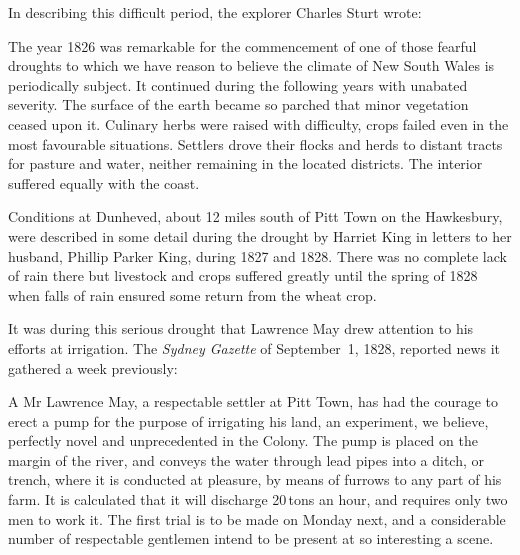 In describing this difficult period, the explorer Charles Sturt
 wrote:
\begin{Quote}
	The year 1826 was remarkable for the commencement of one of
	those fearful droughts to which we have reason
	to believe the climate of New South Wales is periodically
	subject.  It continued during the following years with
	unabated severity.  The surface of the earth became so parched
	that minor vegetation ceased upon it.  Culinary herbs were
	raised with difficulty, crops failed even in the most
	favourable situations.  Settlers drove their flocks and herds
	to distant tracts for pasture and water,
	neither remaining in the located districts.  The interior
	suffered equally with the coast.
\end{Quote}

Conditions at Dunheved, about 12 miles south of
Pitt Town on the Hawkesbury, were described in
some detail during the drought by Harriet King
 in letters to her husband, Phillip Parker King,
  during 1827 and 1828. There was no complete lack
of rain there but livestock and crops suffered greatly until the
spring of 1828 when falls of rain ensured some return from the
wheat crop.

It was during this serious drought that Lawrence May
drew attention to his efforts at irrigation.  The \textit{Sydney
Gaz\-ette} of September~1, 1828, reported news it gathered a week
previously:
\begin{Quote}
	A Mr Lawrence May, a respectable settler at Pitt Town, has had
	the courage to erect a pump for the
	purpose of irrigating his land, an experiment, we believe,
	perfectly novel and unprecedented in the Colony. The pump is
	placed on the margin of the river, and conveys the water
	through lead pipes into a ditch,
	or trench, where it is conducted at pleasure, by means of
	furrows to any part of his farm. It is calculated that it will
	discharge 20\,tons an hour, and requires only two men to work
	it. The first trial is to be made on Monday next, and a
	considerable number of respectable gentlemen intend to be
	present at so interesting a scene.
\end{Quote}

